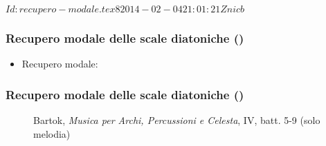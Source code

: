 %
%
\svnInfo $Id: recupero-modale.tex 8 2014-02-04 21:01:21Z nicb $

\setcounter{ms}{0}
\begin{frame}
    \frametitle{Recupero modale delle scale diatoniche ()}

    \begin{itemize}

        \item Recupero modale:

            \begin{center}
                \begin{figure}
                \end{figure}
            \end{center}

    \end{itemize}

\end{frame}

\begin{frame}
    \frametitle{Recupero modale delle scale diatoniche ()}

       \begin{center}
           \begin{figure}
               \caption{%
                        {Bartok, \emph{Musica per Archi, Percussioni e Celesta}, IV, batt. 5-9 (solo melodia)}}
           \end{figure}
       \end{center}

\end{frame}
